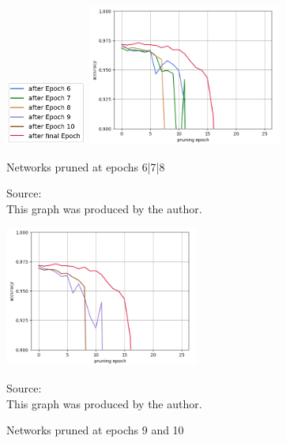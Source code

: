 \begin{figure}
	\begin{minipage}{\textwidth}
		\centering
		\includegraphics[width=100px]{gfx/7-Evaluation/LTH_6_legend.png}
	\end{minipage}
	\begin{minipage}{0.45\textwidth}
		\centering
		\includegraphics[height=175px]{gfx/Experiments/EarlyTicket-MNIST-FCN/678.png}
		\caption{Networks pruned at epochs 6|7|8}
		\vspace{7pt}
		\footnotesize{
			Source:\\
			This graph was produced by the author.
		}
		\label{fig:Early-Tickets-6}
	\end{minipage}\hfill
	\begin{minipage}{0.45\textwidth}
		\centering
		\includegraphics[height=175px]{gfx/Experiments/EarlyTicket-MNIST-FCN/910.png}
		\caption{Networks pruned at epochs 9 and 10}
		\vspace{7pt}
		\footnotesize{
			Source:\\
			This graph was produced by the author.
		}
		\label{fig:Early-Tickets-9}
	\end{minipage}
\end{figure}
